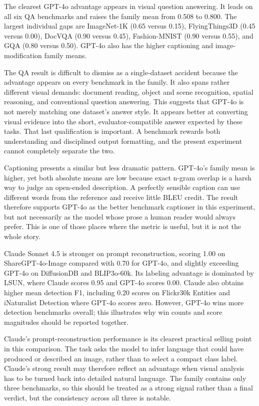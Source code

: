 ﻿\documentclass[11pt,a4paper]{article}
\begin{document}
The clearest GPT-4o advantage appears in visual question answering. It leads
on all six QA benchmarks and raises the family mean from 0.508 to 0.800.
The largest individual gaps are ImageNet-1K (0.65 versus 0.15),
FlyingThings3D (0.45 versus 0.00), DocVQA (0.90 versus 0.45),
Fashion-MNIST (0.90 versus 0.55), and GQA (0.80 versus 0.50).
GPT-4o also has the higher captioning and image-modification family means.

The QA result is difficult to dismiss as a single-dataset accident because
the advantage appears on every benchmark in the family. It also spans rather
different visual demands: document reading, object and scene recognition,
spatial reasoning, and conventional question answering. This suggests that
GPT-4o is not merely matching one dataset's answer style. It appears better
at converting visual evidence into the short, evaluator-compatible answer
expected by these tasks. That last qualification is important. A benchmark
rewards both understanding and disciplined output formatting, and the present
experiment cannot completely separate the two.

Captioning presents a similar but less dramatic pattern. GPT-4o's family mean
is higher, yet both absolute means are low because exact n-gram overlap is a
harsh way to judge an open-ended description. A perfectly sensible caption
can use different words from the reference and receive little BLEU credit.
The result therefore supports GPT-4o as the better benchmark captioner in
this experiment, but not necessarily as the model whose prose a human reader
would always prefer. This is one of those places where the metric is useful,
but it is not the whole story.

Claude Sonnet 4.5 is stronger on prompt reconstruction, scoring 1.00 on
ShareGPT-4o-Image compared with 0.70 for GPT-4o, and slightly exceeding
GPT-4o on DiffusionDB and BLIP3o-60k. Its labeling advantage is dominated by
LSUN, where Claude scores 0.95 and GPT-4o scores 0.00. Claude also obtains
higher mean detection F1, including 0.20 scores on Flickr30k Entities and
iNaturalist Detection where GPT-4o scores zero. However, GPT-4o wins more
detection benchmarks overall; this illustrates why win counts and score
magnitudes should be reported together.

Claude's prompt-reconstruction performance is its clearest practical selling
point in this comparison. The task asks the model to infer language that could
have produced or described an image, rather than to select a compact class
label. Claude's strong result may therefore reflect an advantage when visual
analysis has to be turned back into detailed natural language. The family
contains only three benchmarks, so this should be treated as a strong signal
rather than a final verdict, but the consistency across all three is notable.
\end{document}
